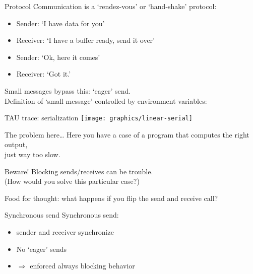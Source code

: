 \begin{numberedframe}{Protocol}
  \label{sl:rendezvous}
Communication is a `rendez-vous' or `hand-shake' protocol:
\begin{itemize}
\item Sender: `I have data for you'
\item Receiver: `I have a buffer ready, send it over'
\item Sender: `Ok, here it comes'
\item Receiver: `Got it.'
\end{itemize}
Small messages bypass this: `eager' send.\\
Definition of `small message' controlled by environment variables:\\
 
\end{numberedframe}

\begin{exerciseframe}
  
\end{exerciseframe}

\begin{numberedframe}{TAU trace: serialization}
  \texttt{[image: graphics/linear-serial]}
  \label{fig:serialization}
\end{numberedframe}

\begin{numberedframe}{The problem here\ldots}
  Here you have a case of a program that computes the right output,\\
  just way too slow.

  Beware! Blocking sends/receives can be trouble. \\
  (How would you solve this particular case?)

  Food for thought: what happens if you flip the send and receive call?
\end{numberedframe}

\begin{exerciseframe}[rightsend]
  
\end{exerciseframe}

\begin{numberedframe}{Synchronous send}
  Synchronous send: 
  \begin{itemize}
  \item sender and receiver synchronize
  \item No `eager' sends
  \item $\Rightarrow$ enforced always blocking behavior
  \end{itemize}
\end{numberedframe}

